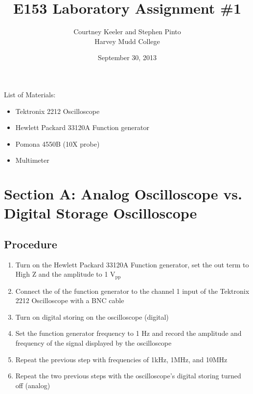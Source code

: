 \documentclass[12pt,letterpaper]{report}
\begin{document}
\title{E153 Laboratory Assignment \#1}
\author{Courtney Keeler and Stephen Pinto\\
Harvey Mudd College}
\date{September 30, 2013}
\maketitle

\begin{center}
List of Materials:
\begin{itemize}
	\item Tektronix 2212 Oscilloscope
	\item Hewlett Packard 33120A Function generator
	\item Pomona 4550B (10X probe)
	\item Multimeter
\end{itemize}
\end{center}

\section*{Section A: Analog Oscilloscope vs. Digital Storage Oscilloscope}
\subsection*{Procedure}
\begin{enumerate}
	\item Turn on the Hewlett Packard 33120A Function generator, set the out term to High Z and the amplitude to 1 $\text{V}_{\text{pp}}$
	\item Connect the of the function generator to the channel 1 input of the Tektronix 2212 Oscilloscope with a BNC cable
	\item Turn on digital storing on the oscilloscope (digital)
	\item Set the function generator frequency to 1 Hz and record the amplitude and frequency of the signal displayed by the oscilloscope
	\item Repeat the previous step with frequencies of 1kHz, 1MHz, and 10MHz
	\item Repeat the two previous steps with the oscilloscope's digital storing turned off (analog)
\end{enumerate}
\end{document}

